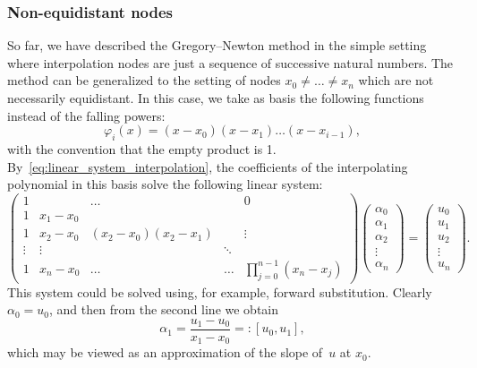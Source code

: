 \subsubsection*{Non-equidistant nodes}%
So far,
we have described the Gregory--Newton method in the simple setting where interpolation nodes are just a sequence of successive natural numbers.
The method can be generalized to the setting of nodes $x_0 \neq \dotsc \neq x_n$ which are not necessarily equidistant.
In this case, we take as basis the following functions instead of the falling powers:
\begin{equation}
    \label{eq:basis_newton}
    \varphi_{i}(x) = (x - x_0) (x - x_1) \dotsc (x - x_{i-1}),
\end{equation}
with the convention that the empty product is 1.
By~\eqref{eq:linear_system_interpolation},
the coefficients of the interpolating polynomial in this basis solve the following linear system:
\begin{equation}
    \label{eq:matrix_newton}
    \begin{pmatrix}
        1 &         & \ldots &        & 0  \\
        1 & x_1-x_0 &        &        &    \\
        1 & x_2-x_0 & (x_2-x_0)(x_2-x_1) &        & \vdots   \\
        \vdots & \vdots  &        & \ddots &    \\
        1 & x_n-x_0 & \ldots & \ldots & \prod_{j=0}^{n-1}(x_n - x_j)
    \end{pmatrix}
    \begin{pmatrix}
        \alpha_0 \\
        \alpha_1 \\
        \alpha_2 \\
        \vdots \\
        \alpha_n
    \end{pmatrix}
    =
    \begin{pmatrix}
        u_0 \\
        u_1 \\
        u_2 \\
        \vdots \\
        u_n
    \end{pmatrix}.
\end{equation}
This system could be solved using, for example, forward substitution.
Clearly $\alpha_0 = u_0$,
and then from the second line we obtain
\[
    \alpha_1 = \frac{u_1 - u_0}{x_1 - x_0} =: [u_0, u_1],
\]
which may be viewed as an approximation of the slope of~$u$ at $x_0$.
